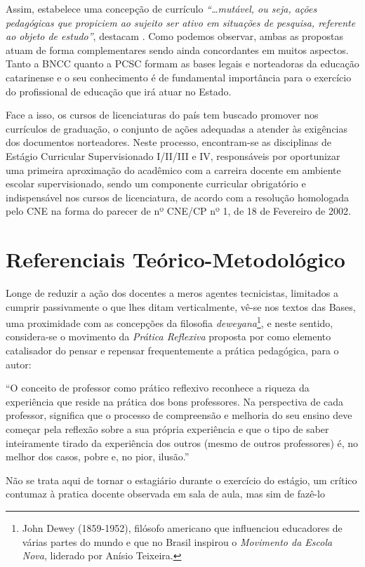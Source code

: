 Assim, estabelece uma concepção de currículo \emph{``\ldots mutável, ou seja, ações pedagógicas que propiciem ao sujeito ser ativo em situações de pesquisa, referente ao objeto de estudo''}, destacam \cite[p.~409]{COMIOTTO:2021}. Como podemos observar, ambas as propostas atuam de forma complementares sendo ainda concordantes em muitos aspectos. Tanto a \ac{BNCC} quanto a \ac{PCSC} formam as bases legais e norteadoras da educação catarinense e o seu conhecimento é de fundamental importância para o exercício do profissional de educação que irá atuar no Estado.

Face a isso, os cursos de licenciaturas do país tem buscado promover nos currículos de graduação, o conjunto de ações adequadas a atender às exigências dos documentos norteadores. Neste processo, encontram-se as disciplinas de Estágio Curricular Supervisionado I/II/III e IV, responsáveis por oportunizar uma primeira aproximação do acadêmico com a carreira docente em ambiente escolar supervisionado, sendo um componente curricular obrigatório e indispensável nos cursos de licenciatura, de acordo com a resolução \cite{BRASIL:2002a} homologada pelo \ac{CNE} na forma do parecer de nº  CNE/CP nº 1, de 18 de Fevereiro de 2002.

\section{Referenciais Teórico-Metodológico}

Longe de reduzir a ação dos docentes a meros agentes tecnicistas, limitados a cumprir passivamente o que lhes ditam verticalmente, vê-se nos textos das Bases, uma proximidade com as concepções da filosofia \emph{deweyana}\footnote{John Dewey (1859-1952), filósofo americano que influenciou educadores de várias partes do mundo e que no Brasil inspirou o \emph{Movimento da Escola Nova}, liderado por Anísio Teixeira.}, e neste sentido, considera-se o movimento da \emph{Prática Reflexiva} proposta por \cite{ZEICHNER:1993} como elemento catalisador do pensar e repensar frequentemente a prática pedagógica, para o autor:

\begin{citacao}
``O conceito de professor como prático reflexivo reconhece a riqueza da experiência que reside na prática dos bons professores. Na perspectiva de cada professor, significa que o processo de compreensão e melhoria do seu ensino deve começar pela reflexão sobre a sua própria experiência e que o tipo de saber inteiramente tirado da experiência dos outros (mesmo de outros professores) é, no melhor dos casos, pobre e, no pior, ilusão.'' 
\end{citacao}
Não se trata aqui de tornar o estagiário durante o exercício do estágio, um crítico contumaz à pratica docente observada em sala de aula, mas sim de fazê-lo

